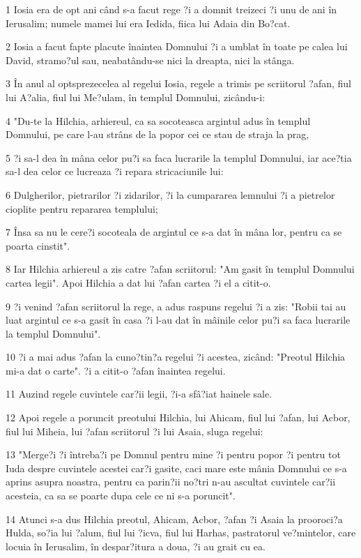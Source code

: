 \par 1 Iosia era de opt ani când s-a facut rege ?i a domnit treizeci ?i unu de ani în Ierusalim; numele mamei lui era Iedida, fiica lui Adaia din Bo?cat.
\par 2 Iosia a facut fapte placute înaintea Domnului ?i a umblat în toate pe calea lui David, stramo?ul sau, neabatându-se nici la dreapta, nici la stânga.
\par 3 În anul al optsprezecelea al regelui Iosia, regele a trimis pe scriitorul ?afan, fiul lui A?alia, fiul lui Me?ulam, în templul Domnului, zicându-i:
\par 4 "Du-te la Hilchia, arhiereul, ca sa socoteasca argintul adus în templul Domnului, pe care l-au strâns de la popor cei ce stau de straja la prag,
\par 5 ?i sa-l dea în mâna celor pu?i sa faca lucrarile la templul Domnului, iar ace?tia sa-l dea celor ce lucreaza ?i repara stricaciunile lui:
\par 6 Dulgherilor, pietrarilor ?i zidarilor, ?i la cumpararea lemnului ?i a pietrelor cioplite pentru repararea templului;
\par 7 Însa sa nu le cere?i socoteala de argintul ce s-a dat în mâna lor, pentru ca se poarta cinstit".
\par 8 Iar Hilchia arhiereul a zis catre ?afan scriitorul: "Am gasit în templul Domnului cartea legii". Apoi Hilchia a dat lui ?afan cartea ?i el a citit-o.
\par 9 ?i venind ?afan scriitorul la rege, a adus raspuns regelui ?i a zis: "Robii tai au luat argintul ce s-a gasit în casa ?i l-au dat în mâinile celor pu?i sa faca lucrarile la templul Domnului".
\par 10 ?i a mai adus ?afan la cuno?tin?a regelui ?i acestea, zicând: "Preotul Hilchia mi-a dat o carte". ?i a citit-o ?afan înaintea regelui.
\par 11 Auzind regele cuvintele car?ii legii, ?i-a sfâ?iat hainele sale.
\par 12 Apoi regele a poruncit preotului Hilchia, lui Ahicam, fiul lui ?afan, lui Acbor, fiul lui Miheia, lui ?afan scriitorul ?i lui Asaia, sluga regelui:
\par 13 "Merge?i ?i întreba?i pe Domnul pentru mine ?i pentru popor ?i pentru tot Iuda despre cuvintele acestei car?i gasite, caci mare este mânia Domnului ce s-a aprins asupra noastra, pentru ca parin?ii no?tri n-au ascultat cuvintele car?ii acesteia, ca sa se poarte dupa cele ce ni s-a poruncit".
\par 14 Atunci s-a dus Hilchia preotul, Ahicam, Acbor, ?afan ?i Asaia la prooroci?a Hulda, so?ia lui ?alum, fiul lui ?icva, fiul lui Harhas, pastratorul ve?mintelor, care locuia în Ierusalim, în despar?itura a doua, ?i au grait cu ea.
